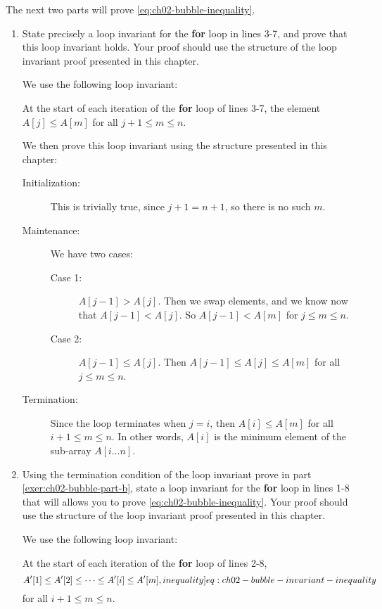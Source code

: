 \documentclass[Chapter02]{subfiles}
\begin{document}
\begin{enumerate}[leftmargin=\labelsep,label={\textbf{\thesection-\arabic*}}]
		The next two parts will prove \cref{eq:ch02-bubble-inequality}.

		\begin{enumerate}[resume]
			\item State precisely a loop invariant for the \textbf{for} loop in lines 3-7, and prove that this loop invariant holds. Your proof should use the structure of the loop invariant proof presented in this chapter. \label{exer:ch02-bubble-part-b}
			\begin{answer}
				We use the following loop invariant:
				\begin{addmargin}[2em]{2em}
					At the start of each iteration of the \textbf{for} loop of lines 3-7, the element $A[j] \leq A[m]$ for all $j + 1 \leq m \leq n$.
				\end{addmargin}

				We then prove this loop invariant using the structure presented in this chapter:
				\begin{description}
					\item[Initialization:] This is trivially true, since $j + 1 = n + 1$, so there is no such $m$.

					\item[Maintenance:] We have two cases:
					\begin{description}
						\item[Case 1:] $A[j - 1] > A[j]$. Then we swap elements, and we know now that $A[j - 1] < A[j]$. So $A[j - 1] < A[m]$ for $j \leq m \leq n$.
						\item[Case 2:] $A[j - 1] \leq A[j]$. Then $A[j - 1] \leq A[j] \leq A[m]$ for all $j \leq m \leq n$.
					\end{description}

					\item[Termination:] Since the loop terminates when $j = i$, then $A[i] \leq A[m]$ for all $i + 1 \leq m \leq n$. In other words, $A[i]$ is the minimum element of the sub-array $A[i \dots n]$.
				\end{description}
			\end{answer}
			
			\item Using the termination condition of the loop invariant prove in part \cref{exer:ch02-bubble-part-b}, state a loop invariant for the \textbf{for} loop in lines 1-8 that will allows you to prove \cref{eq:ch02-bubble-inequality}. Your proof should use the structure of the loop invariant proof presented in this chapter.
			\begin{answer}
				We use the following loop invariant:
				\begin{addmargin}[2em]{2em}
					At the start of each iteration of the \textbf{for} loop of lines 2-8,
					\begin{equation}
						A'[1] \leq A'[2] \leq \dots \leq A'[i] \leq A'[m], \label[inequality]{eq:ch02-bubble-invariant-inequality}
					\end{equation}
					for all $i + 1 \leq m \leq n$.
				\end{addmargin}


\end{answer}
\end{enumerate}
\end{enumerate}
\end{document}
